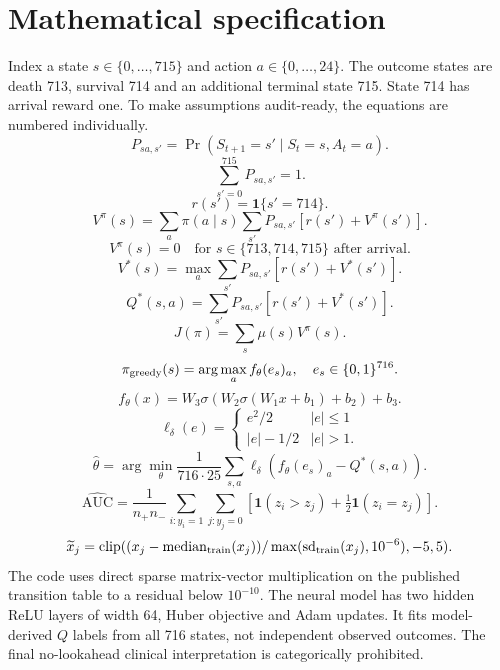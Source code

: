\section{Mathematical specification}
Index a state $s\in\{0,\dots,715\}$ and action $a\in\{0,\dots,24\}$. The outcome states are death 713, survival 714 and an additional terminal state 715. State 714 has arrival reward one. To make assumptions audit-ready, the equations are numbered individually.
\begin{equation}P_{sa,s'}=\Pr(S_{t+1}=s'\mid S_t=s,A_t=a).\end{equation}
\begin{equation}\sum_{s'=0}^{715}P_{sa,s'}=1.\end{equation}
\begin{equation}r(s')=\mathbf{1}\{s'=714\}.\end{equation}
\begin{equation}V^{\pi}(s)=\sum_a\pi(a\mid s)\sum_{s'}P_{sa,s'}[r(s')+V^{\pi}(s')].\end{equation}
\begin{equation}V^{\pi}(s)=0\quad\text{for }s\in\{713,714,715\}\text{ after arrival}.\end{equation}
\begin{equation}V^*(s)=\max_a\sum_{s'}P_{sa,s'}[r(s')+V^*(s')].\end{equation}
\begin{equation}Q^*(s,a)=\sum_{s'}P_{sa,s'}[r(s')+V^*(s')].\end{equation}
\begin{equation}J(\pi)=\sum_s\mu(s)V^{\pi}(s).\end{equation}
\begin{equation}\pi_{\rm greedy}(s)=\arg\max_a f_\theta(e_s)_a,\quad e_s\in\{0,1\}^{716}.\end{equation}
\begin{equation}f_\theta(x)=W_3\sigma(W_2\sigma(W_1x+b_1)+b_2)+b_3.\end{equation}
\begin{equation}\ell_\delta(e)=\begin{cases}e^2/2&|e|\leq 1\\|e|-1/2&|e|>1.\end{cases}\end{equation}
\begin{equation}\widehat\theta=\arg\min_\theta\frac1{716\cdot25}\sum_{s,a}\ell_\delta(f_\theta(e_s)_a-Q^*(s,a)).\end{equation}
\begin{equation}\widehat{\mathrm{AUC}}=\frac{1}{n_+n_-}\sum_{i:y_i=1}\sum_{j:y_j=0}[\mathbf{1}(z_i>z_j)+\tfrac12\mathbf{1}(z_i=z_j)].\end{equation}
\begin{equation}\widetilde x_j=\mathrm{clip}((x_j-\mathrm{median}_{\rm train}(x_j))/\max(\mathrm{sd}_{\rm train}(x_j),10^{-6}),-5,5).\end{equation}
The code uses direct sparse matrix-vector multiplication on the published transition table to a residual below $10^{-10}$. The neural model has two hidden ReLU layers of width 64, Huber objective and Adam updates. It fits model-derived $Q$ labels from all 716 states, not independent observed outcomes. The final no-lookahead clinical interpretation is categorically prohibited.
